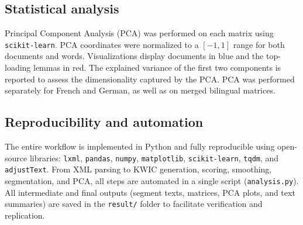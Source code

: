 \subsection{Statistical analysis}

Principal Component Analysis (PCA) was performed on each matrix using \texttt{scikit-learn}. PCA coordinates were normalized to a $[-1,1]$ range for both documents and words. Visualizations display documents in blue and the top-loading lemmas in red. The explained variance of the first two components is reported to assess the dimensionality captured by the PCA. PCA was performed separately for French and German, as well as on merged bilingual matrices.

\subsection{Reproducibility and automation}

The entire workflow is implemented in Python and fully reproducible using open-source libraries: \texttt{lxml}, \texttt{pandas}, \texttt{numpy}, \texttt{matplotlib}, \texttt{scikit-learn}, \texttt{tqdm}, and \texttt{adjustText}. From XML parsing to KWIC generation, scoring, smoothing, segmentation, and PCA, all steps are automated in a single script (\texttt{analysis.py}). All intermediate and final outputs (segment texts, matrices, PCA plots, and text summaries) are saved in the \texttt{result/} folder to facilitate verification and replication.


